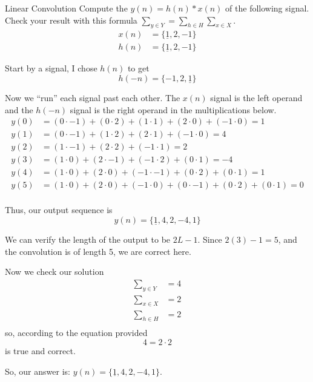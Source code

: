 \begin{example}{Linear Convolution}
  Compute the  $y(n) = h(n) * x(n)$ of the following signal.
  Check your result with this formula $\sum\limits_{y \in Y} = \sum\limits_{h \in H} \sum\limits_{x \in X}$.
  \begin{align*}
    x(n) &= \lbrace \underline{1}, 2, -1 \rbrace \\
    h(n) &= \lbrace \underline{1}, 2, -1 \rbrace
  \end{align*}
  
  \tcblower{}

  Start by  a signal, I chose $h(n)$ to get
  \begin{equation*}
    h(-n) = \lbrace -1, 2, \underline{1} \rbrace
  \end{equation*}

  Now we ``run'' each signal past each other.
  The $x(n)$ signal is the left operand and the $h(-n)$ signal is the right operand in the multiplications below.
  \begin{align*}
    y(0) &= (0 \cdot -1) + (0 \cdot 2) + (1 \cdot 1) + (2 \cdot 0) + (-1 \cdot 0) = 1 \\
    y(1) &= (0 \cdot -1) + (1 \cdot 2) + (2 \cdot 1) + (-1 \cdot 0) = 4 \\
    y(2) &= (1 \cdot -1) + (2 \cdot 2) + (-1 \cdot 1) = 2 \\
    y(3) &= (1 \cdot 0) + (2 \cdot -1) + (-1 \cdot 2) + (0 \cdot 1) = -4 \\
    y(4) &= (1 \cdot 0) + (2 \cdot 0) + (-1 \cdot -1) + (0 \cdot 2) + (0 \cdot 1) = 1 \\
    y(5) &= (1 \cdot 0) + (2 \cdot 0) + (-1 \cdot 0) + (0 \cdot -1) + (0 \cdot 2) + (0 \cdot 1) = 0 \\
  \end{align*}

  Thus, our output sequence is
  \begin{equation*}
    y(n) = \lbrace \underline{1}, 4, 2, -4, 1 \rbrace
  \end{equation*}

  We can verify the length of the output to be $2L-1$.
  Since $2(3)-1 = 5$, and the convolution is of length 5, we are correct here.

  Now we check our solution
  \begin{align*}
    \sum\limits_{y \in Y} &= 4 \\
    \sum\limits_{x \in X} &= 2 \\
    \sum\limits_{h \in H} &= 2 \\
  \end{align*}
  so, according to the equation provided
  \begin{equation*}
    4 = 2 \cdot 2
  \end{equation*}
  is true and correct.

  So, our answer is: $y(n) = \lbrace \underline{1}, 4, 2, -4, 1 \rbrace$.
\end{example}


